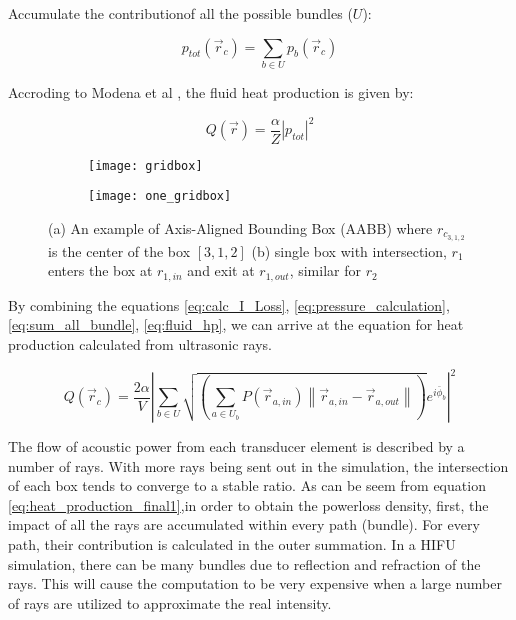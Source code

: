 Accumulate the contributionof all the possible bundles ($U$):

\begin{equation} \label{eq:sum_all_bundle}
    p_{tot}(\vec{r}_c)=\sum_{b \in U}p_b(\vec{r}_c)
\end{equation}

Accroding to Modena et al \cite{Modena_2018}, the fluid heat production is given by:

\begin{equation} \label{eq:fluid_hp}
    Q(\vec{r})=\frac{\alpha}{Z}|p_{tot}|^2
\end{equation}

\begin{figure}
    \centering
    \begin{subfigure}[b]{0.45\textwidth}
        \texttt{[image: gridbox]}
        \caption{}
        \label{fig:gridbox}
    \end{subfigure}
    \begin{subfigure}[b]{0.5\textwidth}
        \texttt{[image: one\_gridbox]}
        \caption{}
        \label{fig:one_gridbox}
    \end{subfigure}
    \caption{(a) An example of Axis-Aligned Bounding Box (AABB) where $r_{c_{3,1,2}}$ is the center of the box $[3,1,2]$ (b) single box with intersection, $r_1$ enters the box at $r_{1,in}$ and exit at $r_{1,out}$, similar for $r_2$}
\end{figure}

By combining the equations \ref{eq:calc_I_Loss}, \ref{eq:pressure_calculation}, \ref{eq:sum_all_bundle}, \ref{eq:fluid_hp}, we can arrive at the equation for heat production calculated from ultrasonic rays.

\begin{equation} \label{eq:heat_production_final1}
    Q(\vec{r}_c)=\frac{2\alpha}{V}\left|\sum_{b \in U}\sqrt{(\sum_{a \in U_b}P(\vec{r}_{a,in})\left\|\vec{r}_{a,in}-\vec{r}_{a,out}\right\|)} e^{i\bar{\phi}_b}\right|^2
\end{equation}

The flow of acoustic power from each transducer element is described by a number of rays\cite{sonavelle}. With more rays being sent out in the simulation, the intersection of each box tends to converge to a stable ratio. As can be seem from equation \ref{eq:heat_production_final1},in order to obtain the powerloss density, first, the impact of all the rays are accumulated within every path (bundle). For every path, their contribution is calculated in the outer summation. In a HIFU simulation, there can be many bundles due to reflection and refraction of the rays. This will cause the computation to be very expensive when a large number of rays are utilized to approximate the real intensity. 

